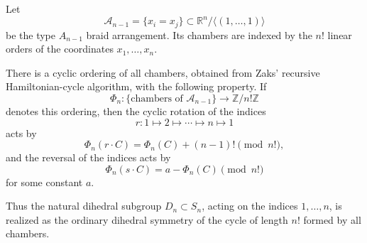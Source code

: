 \documentclass[11pt]{article}
\begin{document}
Let
\[
  \mathcal A_{n-1}=\{x_i=x_j\}
  \subset
  \mathbb R^n/\langle(1,\ldots,1)\rangle
\]
be the type \(A_{n-1}\) braid arrangement. Its chambers are indexed by the
\(n!\) linear orders of the coordinates \(x_1,\ldots,x_n\).

There is a cyclic ordering of all chambers, obtained from Zaks' recursive
Hamiltonian-cycle algorithm, with the following property. If
\[
  \Phi_n:\{\text{chambers of }\mathcal A_{n-1}\}
  \longrightarrow
  \mathbb Z/n!\mathbb Z
\]
denotes this ordering, then the cyclic rotation of the indices
\[
  r:1\mapsto2\mapsto\cdots\mapsto n\mapsto1
\]
acts by
\[
  \Phi_n(r\cdot C)=\Phi_n(C)+(n-1)! \pmod{n!},
\]
and the reversal of the indices acts by
\[
  \Phi_n(s\cdot C)=a-\Phi_n(C) \pmod{n!}
\]
for some constant \(a\).

Thus the natural dihedral subgroup \(D_n\subset S_n\), acting on the indices
\(1,\ldots,n\), is realized as the ordinary dihedral symmetry of the cycle of
length \(n!\) formed by all chambers.
\end{document}
